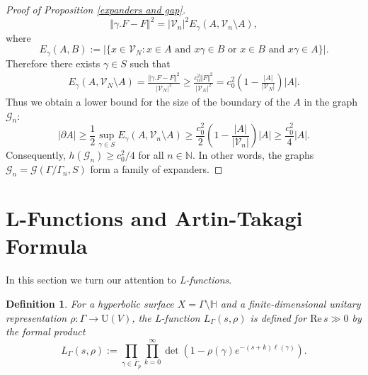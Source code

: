 \documentclass[12pt]{article}
\newtheorem{defi}[thm]{Definition}
\newcommand{\NN}{\mathbb{N}}
\newcommand{\R}{\mathrm{Re}\,}
\newcommand{\HH}{\mathbb{H}}
\begin{document}
\begin{proof}[Proof of Proposition \ref{expanders and gap}]
$$ \Vert \gamma .F - F \Vert^{2} = \vert \mathcal{V}_{n}\vert^{2} E_{\gamma}(A, \mathcal{V}_{n}\setminus A), $$
where
$$ E_{\gamma}(A,B) := \left\vert \{  x\in \mathcal{V}_{N} :  x\in A \text{ and } x\gamma \in B \text{ or } x\in B \text{ and } x\gamma \in A \} \right\vert . $$
Therefore there exists $ \gamma\in S $ such that
\begin{align*}
E_{\gamma}(A, \mathcal{V}_{N}\setminus A)
= \frac{\Vert \gamma. F - F \Vert^{2}}{\vert \mathcal{V}_{N}\vert^{2}}
\geq \frac{c_{0}^{2}\Vert F\Vert^{2}}{\vert \mathcal{V}_{N}\vert^{2}} = c_{0}^{2} \left( 1-\frac{\vert A\vert}{\vert \mathcal{V}_{N}\vert} \right) \vert A\vert.
\end{align*}
Thus we obtain a lower bound for the size of the boundary of the $ A $ in the graph $ \mathcal{G}_{n} $:
$$ \vert \partial A\vert \geq \frac{1}{2} \sup_{\gamma\in S} E_{\gamma}(A, \mathcal{V}_{n}\setminus A) \geq  \frac{c_{0}^{2}}{2} \left( 1-\frac{\vert A\vert}{\vert \mathcal{V}_{n}\vert} \right) \vert A\vert \geq \frac{c_{0}^{2}}{4} \vert A\vert. $$
Consequently, $ h(\mathcal{G}_{n}) \geq c_{0}^{2}/4 $ for all $ n\in \NN. $ In other words, the graphs $ \mathcal{G}_{n}=\mathcal{G}(\Gamma/\Gamma_{n}, S) $ form a family of expanders.
\end{proof}





\section{L-Functions and Artin-Takagi Formula}\label{L-Functions and Artin-Takagi Formula}

In this section we turn our attention to \textit{L-functions}.

\begin{defi}
For a hyperbolic surface $ X=\Gamma\setminus \HH $ and a finite-dimensional unitary representation $ \rho : \Gamma \to \mathrm{U}(V) $, the L-function $ L_{\Gamma}(s,\rho) $ is defined for $ \R s \gg 0 $ by the formal product
\begin{equation}\label{prod}
L_{\Gamma}(s,\rho) := \prod_{\overline{\gamma}\in \overline{\Gamma}_{p}} \prod_{k=0}^{\infty} \det\left( 1-\rho(\gamma)e^{-(s+k)\ell(\gamma)}\right).
\end{equation}
\end{defi}
\end{document}
